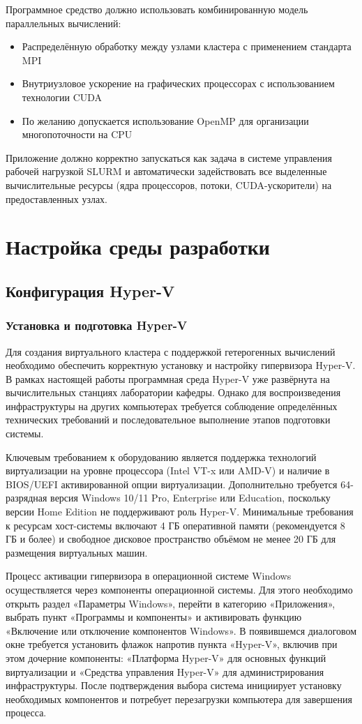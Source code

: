 \documentclass[areaset=advanced]{scrartcl}
\begin{document}
Программное средство должно использовать комбинированную модель параллельных вычислений:
\begin{itemize}
    \item Распределённую обработку между узлами кластера с применением стандарта MPI
    \item Внутриузловое ускорение на графических процессорах с использованием технологии CUDA
    \item По желанию допускается использование OpenMP для организации многопоточности на CPU
\end{itemize}

Приложение должно корректно запускаться как задача в системе управления рабочей нагрузкой SLURM и автоматически задействовать все выделенные вычислительные ресурсы (ядра процессоров, потоки, CUDA-ускорители) на предоставленных узлах.

\newpage
\section{Настройка среды разработки}
\subsection{Конфигурация Hyper-V}
\subsubsection{Установка и подготовка Hyper-V}
Для создания виртуального кластера с поддержкой гетерогенных вычислений необходимо обеспечить корректную установку и настройку гипервизора Hyper-V. В рамках настоящей работы программная среда Hyper-V уже развёрнута на вычислительных станциях лаборатории кафедры. Однако для воспроизведения инфраструктуры на других компьютерах требуется соблюдение определённых технических требований и последовательное выполнение этапов подготовки системы.

Ключевым требованием к оборудованию является поддержка технологий виртуализации на уровне процессора (Intel VT-x или AMD-V) и наличие в BIOS/UEFI активированной опции виртуализации. Дополнительно требуется 64-разрядная версия Windows 10/11 Pro, Enterprise или Education, поскольку версии Home Edition не поддерживают роль Hyper-V. Минимальные требования к ресурсам хост-системы включают 4 ГБ оперативной памяти (рекомендуется 8 ГБ и более) и свободное дисковое пространство объёмом не менее 20 ГБ для размещения виртуальных машин.

Процесс активации гипервизора в операционной системе Windows осуществляется через компоненты операционной системы. Для этого необходимо открыть раздел «Параметры Windows», перейти в категорию «Приложения», выбрать пункт «Программы и компоненты» и активировать функцию «Включение или отключение компонентов Windows». В появившемся диалоговом окне требуется установить флажок напротив пункта «Hyper-V», включив при этом дочерние компоненты: «Платформа Hyper-V» для основных функций виртуализации и «Средства управления Hyper-V» для администрирования инфраструктуры. После подтверждения выбора система инициирует установку необходимых компонентов и потребует перезагрузки компьютера для завершения процесса.
\end{document}
